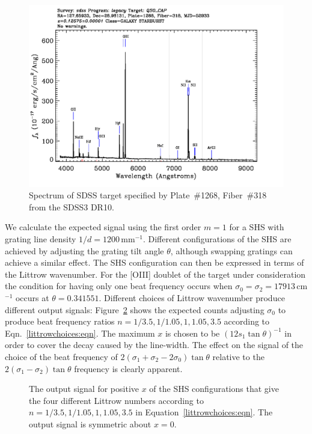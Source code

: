 \documentclass[preprint]{aastex}
\begin{document}
\begin{figure}[t]
   \centering
    \includegraphics[scale=0.4]{SpecById.pdf} 
   \caption{Spectrum of SDSS target specified by Plate~\#1268, Fiber~\#318 from the SDSS3 DR10.  \label{shsinput:fig}}
\end{figure}

We calculate the expected signal using the first order $m=1$ for a SHS with grating line density $1/d=1200$\,mm$^{-1}$.
Different configurations of the SHS are achieved by adjusting the grating tilt angle $\theta$, although swapping
gratings can achieve a similar effect.
The SHS configuration can then be expressed in terms of the Littrow wavenumber.  For the [OIII] doublet of
the target under consideration
the condition for having only one beat frequency occurs when $\sigma_0=\sigma_2=17913$\,cm$^{-1}$
occurs at $\theta=0.341551$.
Different choices of Littrow wavenumber
produce different output signals:
Figure~\ref{shscounts:fig} shows the expected counts adjusting $\sigma_0$ to produce beat frequency ratios
$n=1/3.5,1/1.05,1,1.05,3.5$ according to Eqn.\ \ref{littrowchoices:eqn}.
The maximum $x$ is chosen to be $(12s_1\tan{\theta})^{-1}$ in order to cover the decay caused by the line-width.
The effect on the signal
of the choice of the beat frequency of $2(\sigma_1+\sigma_2-2\sigma_0)\tan{\theta}$ relative to the $2(\sigma_1-\sigma_2)\tan{\theta}$ frequency
is clearly apparent.

\begin{figure}[t]
   \centering
   \caption{The output signal for positive $x$ of the  SHS configurations that give the four different
   Littrow numbers according to
   $n=1/3.5,1/1.05,1,1.05,3.5$  in Equation~\ref{littrowchoices:eqn}. The output signal is symmetric about $x=0$.\label{shscounts:fig}}
\end{figure}
\end{document}
